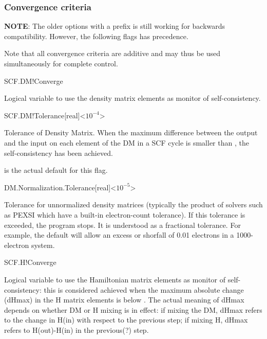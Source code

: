 \subsubsection{Convergence criteria}

\textbf{NOTE}: The older options with a  prefix is still
working for backwards compatibility. However, the following flags has
precedence.

Note that all convergence criteria are additive and may thus be used
simultaneously for complete control.

\begin{fdflogicalT}{SCF.DM!Converge}

  Logical variable to use the density matrix elements as monitor
  of self-consistency.
  
\end{fdflogicalT}

\begin{fdfentry}{SCF.DM!Tolerance}[real]<$10^{-4}$>%

  Tolerance of Density Matrix.
  When the maximum difference between the output and the input on each
  element of the DM in a SCF cycle is smaller than
  , the self-consistency has been achieved.


  \note {} is the actual default for this flag.

\end{fdfentry}

\begin{fdfentry}{DM.Normalization.Tolerance}[real]<$10^{-5}$>

  Tolerance for unnormalized density matrices (typically the product
  of solvers such as PEXSI which have a built-in electron-count
  tolerance). If this tolerance is exceeded, the program stops. It is
  understood as a fractional tolerance. For example, the default will
  allow an excess or shorfall of 0.01 electrons in a 1000-electron
  system.

\end{fdfentry}



\begin{fdflogicalT}{SCF.H!Converge}

  Logical variable to use the Hamiltonian matrix elements as monitor
  of self-consistency: this is considered achieved when the maximum
  absolute change (dHmax) in the H matrix elements is below
  . The actual meaning of dHmax depends on
  whether DM or H mixing is in effect: if mixing the DM, dHmax refers
  to the change in H(in) with respect to the previous step; if mixing
  H, dHmax refers to H(out)-H(in) in the previous(?) step. 
  
\end{fdflogicalT}

